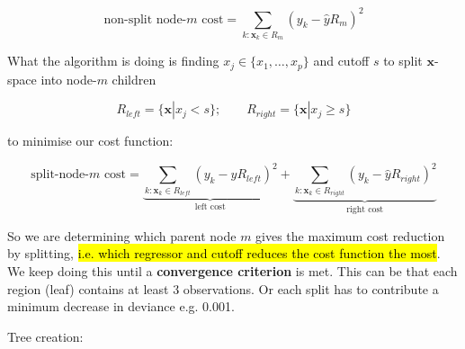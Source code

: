 \documentclass[11pt]{article}
\begin{document}
\begin{equation*}
    \text{non-split node-}m \text{ cost} = \sum_{k:\mathbf{x}_k\in R_m}(y_k - \hat{y}R_m)^2
\end{equation*}

What the algorithm is doing is finding $x_j \in \{x_1, \ldots, x_p\}$ and cutoff $s$ to split $\mathbf{x}$-space into node-$m$ children

\begin{equation*}
    R_{left} = \{\mathbf{x}|x_j<s\}; \qquad R_{right} = \{\mathbf{x}|x_j \geq s\}
\end{equation*}

to minimise our cost function:

\begin{equation*}
    \text{split-node-}m \text{ cost} = \underbrace{\sum_{k:\mathbf{x}_k\in R_{left}}(y_k - \hat{y}R_{left})^2}_{\text{left cost}} + \underbrace{\sum_{k:\mathbf{x}_k\in R_{right}}(y_k - \hat{y}R_{right})^2}_{\text{right cost}}
\end{equation*}

So we are determining which parent node $m$ gives the maximum cost reduction by splitting, \hl{i.e. which regressor and cutoff reduces the cost function the most}. We keep doing this until a \textbf{convergence criterion} is met. This can be that each region (leaf) contains at least 3 observations. Or each split has to contribute a minimum decrease in deviance e.g. 0.001.


    
\begin{algo}

Tree creation:

\begin{center}

\end{center}
    
\end{algo}
\end{document}
